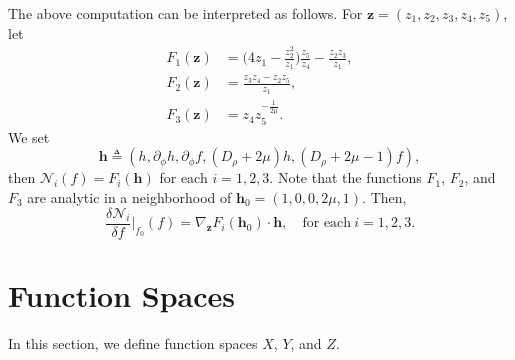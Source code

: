 \documentclass[11pt]{article}
\theoremstyle{definition}
\theoremstyle{remark}
\numberwithin{equation}{section}
\newcommand{\mbf}{\mathbf}
\newcommand{\mcal}{\mathcal}
\newcommand{\del}{\partial}
\newcommand{\grad}{\nabla}
\begin{document}
The above computation can be interpreted as follows. For $\mbf{z} = (z_1, z_2, z_3, z_4, z_5)$, let
\begin{align*}
    F_1(\mbf{z}) &= \Big(4z_1 - \frac{z_2^2}{z_1} \Big) \frac{z_5}{z_4} - \frac{z_2 z_3}{z_1},\\
    F_2(\mbf{z}) &= \frac{z_3 z_4 - z_2 z_5}{z_1},\\
    F_3(\mbf{z}) &= z_4 z_5^{-\frac{1}{2\mu}}.
\end{align*}
We set
\[\mbf{h} \triangleq (h, \del_\phi h, \del_\phi f, (D_\rho + 2\mu) h, (D_\rho + 2\mu - 1)f),\]
then $\mcal{N}_i (f) = F_i(\mbf{h})$ for each $i=1,2,3$. Note that the functions $F_1$, $F_2$, and $F_3$ are analytic in a neighborhood of $\mbf{h}_0 = (1, 0, 0, 2\mu, 1)$. Then,
\begin{equation} \label{eq:2.12}
\frac{\delta \mcal{N}_i}{\delta f}\bigg\vert_{f_0}(f) = \grad_{\mbf{z}} F_i(\mbf{h}_0) \cdot \mbf{h}, \quad\text{for each}~ i=1,2,3.
\end{equation}

\section{Function Spaces} \label{sec:3}
In this section, we define function spaces $X$, $Y$, and $Z$.
\end{document}
